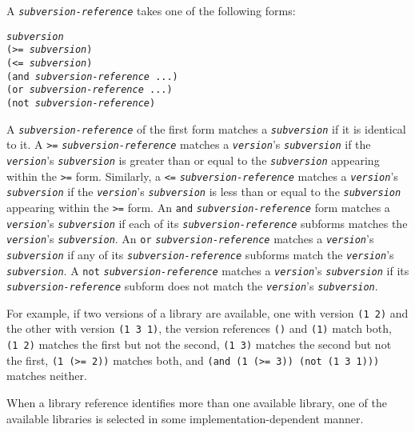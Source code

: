 A \texttt{\textit{subversion-reference}} takes one of the following forms:


\begin{alltt}
\textit{subversion}
(\textgreater{}= \textit{subversion})
(\textless{}= \textit{subversion})
(and \textit{subversion-reference} ...)
(or \textit{subversion-reference} ...)
(not \textit{subversion-reference})
\end{alltt}


A \texttt{\textit{subversion-reference}} of the first form matches a
\texttt{\textit{subversion}} if it is identical to it.
A \texttt{\textgreater{}=} \texttt{\textit{subversion-reference}} matches a \texttt{\textit{version}}'s
\texttt{\textit{subversion}} if the \texttt{\textit{version}}'s \texttt{\textit{subversion}} is greater
than or equal to the \texttt{\textit{subversion}} appearing within the
\texttt{\textgreater{}=} form.
Similarly, a \texttt{\textless{}=} \texttt{\textit{subversion-reference}} matches a \texttt{\textit{version}}'s
\texttt{\textit{subversion}} if the \texttt{\textit{version}}'s \texttt{\textit{subversion}} is less
than or equal to the \texttt{\textit{subversion}} appearing within the
\texttt{\textgreater{}=} form.
An \texttt{and} \texttt{\textit{subversion-reference}} form
matches a \texttt{\textit{version}}'s \texttt{\textit{subversion}} if each of its
\texttt{\textit{subversion-reference}} subforms matches the \texttt{\textit{version}}'s
\texttt{\textit{subversion}}.
An \texttt{or} \texttt{\textit{subversion-reference}} matches a \texttt{\textit{version}}'s
\texttt{\textit{subversion}} if any of its \texttt{\textit{subversion-reference}} subforms match
the \texttt{\textit{version}}'s \texttt{\textit{subversion}}.
A \texttt{not} \texttt{\textit{subversion-reference}} matches a \texttt{\textit{version}}'s
\texttt{\textit{subversion}} if its \texttt{\textit{subversion-reference}} subform does not
match the \texttt{\textit{version}}'s \texttt{\textit{subversion}}.


For example, if two versions of a library are available, one with version
\texttt{(1 2)} and the other with version \texttt{(1 3 1)}, the
version references \texttt{()} and \texttt{(1)} match both,
\texttt{(1 2)} matches the first but not the second,
\texttt{(1 3)} matches the second but not the first,
\texttt{(1 (\textgreater{}= 2))} matches both, and
\texttt{(and (1 (\textgreater{}= 3)) (not (1 3 1)))} matches neither.


When a library reference identifies more than one available library,
one of the available libraries is selected in some
implementation-dependent manner.


